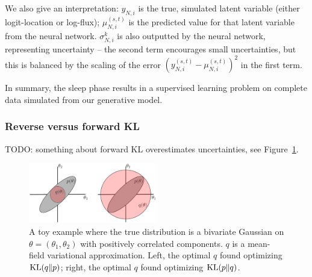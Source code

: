 We also give an interpretation: $y_{N,i}$ is the true, simulated latent variable (either logit-location or log-flux); $\mu^{(s,t)}_{N,i}$ is the predicted value for that latent variable from the neural network. $\sigma^{k}_{N,i}$ is also outputted by the neural network, representing uncertainty -- the second term encourages small uncertainties, but this is 
balanced by the scaling of the error $(y^{(s,t)}_{N,i} - \mu^{(s,t)}_{N,i})^2$ in the first term. 

In summary, the sleep phase results in a supervised learning problem on complete data simulated from our generative model. 

\subsubsection{Reverse versus forward KL}
\label{sec:kl_q_p}
TODO: something about forward KL overestimates uncertainties, see Figure~\ref{fig:kl_q_p_schematic}. 

\begin{figure}[!ht]
    \centering
    \includegraphics[width = 0.5\textwidth]{figures/kl_q_p_schematic.png}
    \caption{A toy example where the true distribution is a bivariate Gaussian on 
    $\theta = (\theta_1, \theta_2)$ with positively correlated components. 
    $q$ is a mean-field variational approximation. Left, the optimal $q$ found 
    optimizing $\textrm{KL}(q\|p)$; right, the optimal $q$ found optimizing $\textrm{KL}(p\|q)$. }
    \label{fig:kl_q_p_schematic}
\end{figure}

